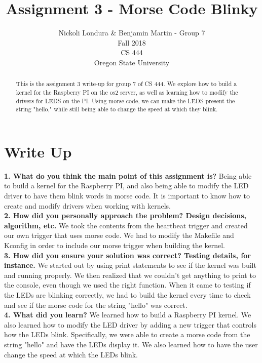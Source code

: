 \documentclass[10pt,english]{article}
\title{Assignment 3 - Morse Code Blinky}
\author{Nickoli Londura \& Benjamin Martin - Group 7 \\ Fall 2018 \\ CS 444 \\ Oregon State University}
\begin{document}
\maketitle

\begin{abstract}

\noindent This is the assignment 3 write-up for group 7 of CS 444. We explore how to build a kernel for the Raspberry PI on the os2 server, as well as learning how to modify the drivers for LEDS on the PI. Using morse code, we can make the LEDS present the string "hello," while still being able to change the speed at which they blink.

\end{abstract}

\newpage

\section{Write Up}

\textbf{1. What do you think the main point of this assignment is?}
Being able to build a kernel for the Raspberry PI, and also being able to modify the LED driver to have them blink words in morse code. It is important to know how to create and modify drivers when working with kernels. \\

\noindent \textbf{2. How did you personally approach the problem? Design decisions, algorithm, etc.}
We took the contents from the heartbeat trigger and created our own trigger that uses morse code. We had to modify the Makefile and Kconfig in order to include our morse trigger when building the kernel. \\


\noindent \textbf{3. How did you ensure your solution was correct? Testing details, for instance.}
We started out by using print statements to see if the kernel was built and running properly. We then realized that we couldn't get anything to print to the console, even though we used the right function. When it came to testing if the LEDs are blinking correctly, we had to build the kernel every time to check and see if the morse code for the string "hello" was correct.\\


\noindent \textbf{4. What did you learn?}
We learned how to build a Raspberry PI kernel. We also learned how to modify the LED driver by adding a new trigger that controls how the LEDs blink. Specifically, we were able to create a morse code from the string "hello" and have the LEDs display it. We also learned how to have the user change the speed at which the LEDs blink. \\
\end{document}
